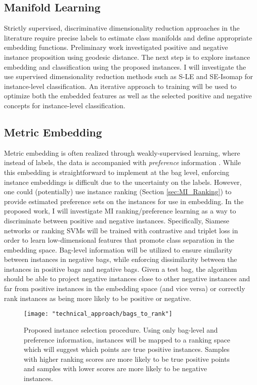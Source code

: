 \subsection{Manifold Learning}
Strictly supervised, discriminative dimensionality reduction approaches in the literature require precise labels to estimate class manifolds and define appropriate embedding functions.  Preliminary work investigated positive and negative instance proposition using geodesic distance.  The next step is to explore instance embedding and classification using the proposed instances.  I will investigate the use  supervised dimensionality reduction methods such as S-LE and SE-Isomap for instance-level classification.  An iterative approach to training will be used to optimize both the embedded features as well as the selected positive and negative concepts for instance-level classification.

\subsection{Metric Embedding}
Metric embedding is often realized through weakly-supervised learning, where instead of labels, the data is accompanied with \textit{preference} information \citep{Hermans2017DefenseTripletLoss,Koch2015SiameseNetworks,Schroff2015FaceNet}. While this embedding is straightforward to implement at the bag level, enforcing instance embeddings is difficult due to the uncertainty on the labels.  However, one could (potentially) use instance ranking (Section \ref{sec:MI_Ranking}) to provide estimated preference sets on the instances for use in embedding.  In the proposed work, I will investigate MI ranking/preference learning as a way to discriminate between positive and negative instances.  Specifically, Siamese networks or ranking SVMs will be trained with contrastive and triplet loss in order to learn low-dimensional features that promote class separation in the embedding space.  Bag-level information will be utilized to ensure similarity between instances in negative bags, while enforcing dissimilarity between the instances in positive bags and negative bags.  Given a test bag, the algorithm should be able to project negative instances close to other negative instances and far from positive instances in the embedding space (and vice versa) or correctly rank instances as being more likely to be positive or negative.

\begin{center}
	\begin{figure*}[h]
		\centering
		\texttt{[image: "technical\_approach/bags\_to\_rank"]}
		\caption[Ranking MIL instances]{Proposed instance selection procedure.  Using only bag-level and preference information, instances will be mapped to a ranking space which will suggest which points are true positive instances.  Samples with higher ranking scores are more likely to be true positive points and samples with lower scores are more likely to be negative instances.}
		\label{fig:proposed_metric_embedding}
	\end{figure*}
\end{center}

